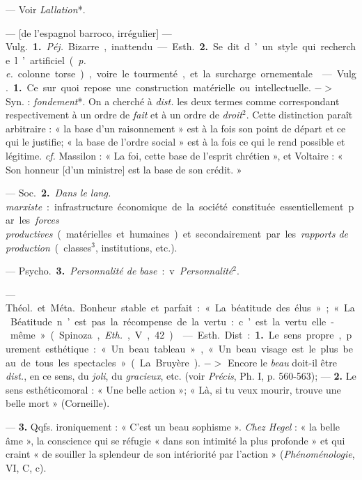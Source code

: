 
	\begin{itemize}[leftmargin=1cm, label=, itemsep=1pt]

 — Voir {\it Lallation}*.

 — [de l'espagnol {\it }barroco, irrégulier] — \si{Vulg.} {\bf 1.} {\it Péj.} Bizarre,
inattendu. — \si{Esth.} {\bf 2.} Se dit d’un
style qui recherche l’artificiel ({\it p. e.}
colonne torse), voire le tourmenté,
et la surcharge ornementale.

 — \si{Vulg.} {\bf 1.} Ce sur quoi repose
une construction matérielle ou intellectuelle. $->$ Syn. : {\it fondement}*. On
a cherché à {\it dist.} les deux termes
comme correspondant respectivement à un ordre de {\it fait} et à un ordre
de {\it droit}$^2$. Cette distinction paraît
arbitraire : « la base d’un raisonnement » est à la fois son point de
départ et ce qui le justifie; « la base
de l’ordre social » est à la fois ce qui
le rend possible et légitime. {\it cf.}  Massilon : « La foi, cette base de l'esprit
chrétien », et Voltaire : « Son honneur [d'un ministre] est la base de
son crédit. »

— \si{Soc.} {\bf 2.} {\it Dans le lang. marxiste} :
infrastructure économique de la
société constituée essentiellement
par les {\it forces productives} (matérielles
et humaines) et secondairement par
les {\it rapports de production} (classes$^3$,
institutions, etc.).

— \si{Psycho.} {\bf 3.} {\it Personnalité de base} :
v. {\it Personnalité}$^2$.

 — \si{Théol.} et \si{Méta.} Bonheur
stable et parfait : « La béatitude des
élus »; « La Béatitude n’est pas la
récompense de la vertu : c’est la vertu elle-même » (Spinoza, {\it Eth.}, V, 42).

 — \si{Esth.} Dist. : {\bf 1.} Le sens propre,
purement esthétique : « Un beau
tableau », « Un beau visage est le
plus beau de tous les spectacles » (La
Bruyère). $->$ Encore le {\it beau} doit-il
être {\it dist.}, en ce sens, du {\it joli}, du
{\it gracieux}, etc. (voir {\it Précis}, Ph. I,
p. 560-563); — {\bf 2.} Le sens esthéticomoral : « Une belle action »; « Là, si
tu veux mourir, trouve une belle
mort » (Corneille).
 
— {\bf 3.} Qqfs. ironiquement : « C’est
un beau sophisme ». {\it Chez Hegel} :
« la belle âme », la conscience qui se
réfugie « dans son intimité la plus
profonde » et qui craint « de souiller
la splendeur de son intériorité par
l’action » ({\it Phénoménologie}, VI, C, c).


\end{itemize}
